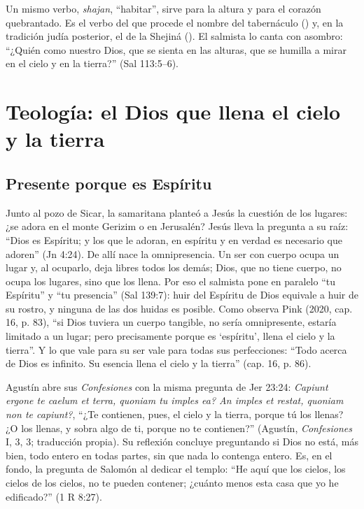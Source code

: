 Un mismo verbo,  \emph{shajan}, ``habitar'', sirve para la altura y para el corazón quebrantado. Es el verbo del que procede el nombre del tabernáculo () y, en la tradición judía posterior, el de la Shejiná (). El salmista lo canta con asombro: ``¿Quién como \SENOR{} nuestro Dios, que se sienta en las alturas, que se humilla a mirar en el cielo y en la tierra?'' (Sal 113:5--6).

\section{Teología: el Dios que llena el cielo y la tierra}

\subsection{Presente porque es Espíritu}

Junto al pozo de Sicar, la samaritana planteó a Jesús la cuestión de los lugares: ¿se adora en el monte Gerizim o en Jerusalén? Jesús lleva la pregunta a su raíz: ``Dios es Espíritu; y los que le adoran, en espíritu y en verdad es necesario que adoren'' (Jn 4:24). De allí nace la omnipresencia. Un ser con cuerpo ocupa un lugar y, al ocuparlo, deja libres todos los demás; Dios, que no tiene cuerpo, no ocupa los lugares, sino que los llena. Por eso el salmista pone en paralelo ``tu Espíritu'' y ``tu presencia'' (Sal 139:7): huir del Espíritu de Dios equivale a huir de su rostro, y ninguna de las dos huidas es posible. Como observa Pink (2020, cap. 16, p. 83), ``si Dios tuviera un cuerpo tangible, no sería omnipresente, estaría limitado a un lugar; pero precisamente porque es `espíritu', llena el cielo y la tierra''. Y lo que vale para su ser vale para todas sus perfecciones: ``Todo acerca de Dios es infinito. Su esencia llena el cielo y la tierra'' (cap. 16, p. 86).

Agustín abre sus \emph{Confesiones} con la misma pregunta de Jer 23:24: \emph{Capiunt ergone te caelum et terra, quoniam tu imples ea? An imples et restat, quoniam non te capiunt?}, ``¿Te contienen, pues, el cielo y la tierra, porque tú los llenas? ¿O los llenas, y sobra algo de ti, porque no te contienen?'' (Agustín, \emph{Confesiones} I, 3, 3; traducción propia). Su reflexión concluye preguntando si Dios no está, más bien, todo entero en todas partes, sin que nada lo contenga entero. Es, en el fondo, la pregunta de Salomón al dedicar el templo: ``He aquí que los cielos, los cielos de los cielos, no te pueden contener; ¿cuánto menos esta casa que yo he edificado?'' (1 R 8:27).


